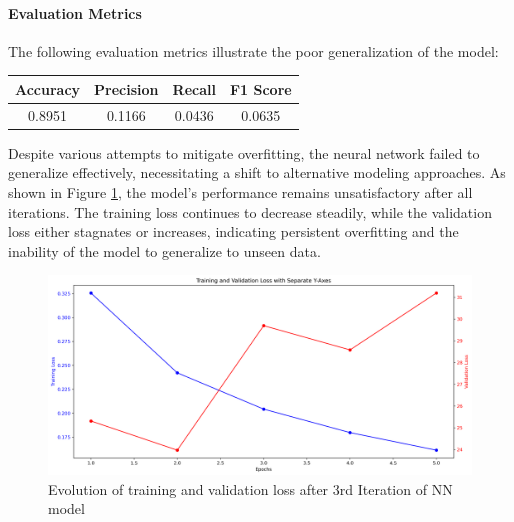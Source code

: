 \documentclass[conference,9pt]{IEEEtran}
\begin{document}
\paragraph{Evaluation Metrics}
The following evaluation metrics illustrate the poor generalization of the model:
\begin{center}
    \begin{tabular}{c|c|c|c}
        Accuracy & Precision & Recall & F1 Score \\ 
        \hline 
        0.8951 & 0.1166 &  0.0436 & 0.0635\\
    \end{tabular}
\end{center}
Despite various attempts to mitigate overfitting, the neural network failed to generalize effectively, necessitating a shift to alternative modeling approaches. As shown in Figure \ref{fig:It3}, the model's performance remains unsatisfactory after all iterations. The training loss continues to decrease steadily, while the validation loss either stagnates or increases, indicating persistent overfitting and the inability of the model to generalize to unseen data.
\begin{figure}[!t]
    \centering
    \includegraphics[width=.75\textwidth]{../training_validation_loss_Iteration3.png}
    \caption{Evolution of training and validation loss after 3rd Iteration of NN model}
    \label{fig:It3}
\end{figure}
\end{document}
